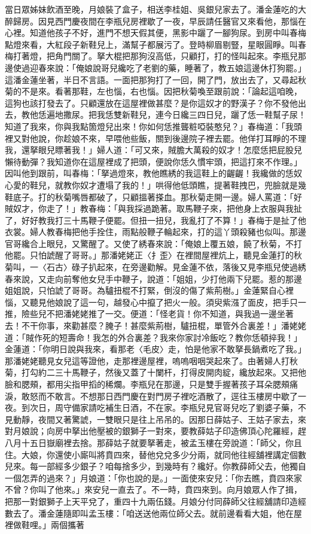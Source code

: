\begin{showcontents}{}
當日眾姊妹飲酒至晚，月娘裝了盒子，相送李桂姐、吳銀兒家去了。潘金蓮吃的大醉歸房。因見西門慶夜間在李瓶兒房裡歇了一夜，早辰請任醫官又來看他，那惱在心裡。知道他孩子不好，進門不想天假其便，黑影中躧了一腳狗尿。到房中叫春梅點燈來看，大紅段子新鞋兒上，滿幫子都展污了。登時柳眉剔豎，星眼圓睜。叫春梅打著燈，把角門關了。拏大棍把那狗沒高低，只顧打，打的怪叫起來。李瓶兒那邊使過迎春來說：「俺娘說哥兒纔吃了老劉的藥，睡著了，教五娘這邊休打狗罷。」這潘金蓮坐著，半日不言語。一面把那狗打了一回，開了門，放出去了，又尋起秋菊的不是來。看著那鞋，左也惱，右也惱。因把秋菊喚至跟前說：「論起這咱晚，這狗也該打發去了。只顧還放在這屋裡做甚麼？是你這奴才的野漢子？你不發他出去，教他恁遍地撒尿。把我恁雙新鞋兒，連今日纔三四日兒，躧了恁一鞋幫子尿！知道了我來，你與我點箇燈兒出來！你如何恁推聾粧啞裝憨兒？」春梅道：「我頭裡又對他說，你趁娘不來，早喂他些飯，關到後邊院子裡去罷。他佯打耳睜的不理我，還拏眼兒瞟著我！」婦人道：「可又來，賊膽大萬殺的奴才！怎麼恁把屁股兒懶待動彈？我知道你在這屋裡成了把頭，便說你恁久慣牢頭，把這打來不作理。」因叫他到跟前，叫春梅：「拏過燈來，教他瞧綉的我這鞋上的齷齷！我纔做的恁奴心愛的鞋兒，就教你奴才遭塌了我的！」哄得他低頭瞧，提著鞋拽巴，兜臉就是幾鞋底子。打的秋菊嘴唇都破了，只顧搵著搽血。那秋菊走開一邊。婦人罵道：「好賊奴才，你走了！」教春梅：「與我採過跪著。取馬鞭子來，把他身上衣服與我扯了，好好教我打三十馬鞭子便罷。但扭一扭兒，我亂打了不算！」春梅于是扯了他衣裳。婦人教春梅把他手拴住，雨點般鞭子輪起來，打的這丫頭殺豬也似叫。那邊官哥纔合上眼兒，又驚醒了。又使了綉春來說：「俺娘上覆五娘，饒了秋菊，不打他罷。只怕諕醒了哥哥。」那潘姥姥正〈扌歪〉在裡間屋裡炕上，聽見金蓮打的秋菊叫，一〈石古〉碌子扒起來，在旁邊勸解。見金蓮不依，落後又見李瓶兒使過綉春來說，又走向前奪他女兒手中鞭子，說道：「姐姐，少打他兩下兒罷。惹的那邊姐姐說，只怕諕了哥哥。為驢扭棍不打緊，倒沒的傷了紫荊樹。」金蓮緊自心裡惱，又聽見他娘說了這一句，越發心中攛了把火一般。須臾紫漒了面皮，把手只一推，險些兒不把潘姥姥推了一交。便道：「怪老貨！你不知道，與我過一邊坐著去！不干你事，來勸甚麼？腌子！甚麼紫荊樹，驢扭棍，單管外合裏差！」潘姥姥道：「賊作死的短壽命！我怎的外合裏差？我來你家討冷飯吃？教你恁頓捽我！」金蓮道：「你明日說與我來，看那老〈毛皮〉走，怕是他家不敢拏長鍋煮吃了我。」那潘姥姥聽見女兒這等證他，走那裡邊屋裡，嗚嗚咽咽哭起來了。由著婦人打秋菊，打勾約二三十馬鞭子，然後又蓋了十闌杆，打得皮開肉綻，纔放起來。又把他臉和腮頰，都用尖指甲搯的稀爛。李瓶兒在那邊，只是雙手握著孩子耳朵腮頰痛淚，敢怒而不敢言。不想那日西門慶在對門房子裡吃酒散了，逕往玉樓房中歇了一夜。到次日，周守備家請吃補生日酒，不在家。李瓶兒見官哥兒吃了劉婆子藥，不見動靜，夜間又著驚諕，一雙眼只是往上吊吊的。因那日薛姑子、王姑子家去，來對月娘說；向房中拏出他壓被的銀獅子一對來，要教薛姑子印造佛頂心陀羅經，趕八月十五日嶽廟裡去捨。那薛姑子就要拏著走，被孟玉樓在旁說道：「師父，你且住。大娘，你還使小廝叫將賁四來，替他兌兌多少分兩，就同他往經舖裡講定個數兒來。每一部經多少銀子？咱每捨多少，到幾時有？纔好。你教薛師父去，他獨自一個怎弄的過來？」月娘道：「你也說的是。」一面使來安兒：「你去瞧，賁四來家不曾？你叫了他來。」來安兒一直去了。不一時，賁四來到。向月娘眾人作了揖，把那一對銀獅子上天平兌了，重四十九兩伍錢。月娘分付同薛師父往經舖請印造經數去了。潘金蓮隨即叫孟玉樓：「咱送送他兩位師父去。就前邊看看大姐，他在屋裡做鞋哩。」兩個攜著
\end{showcontents}
